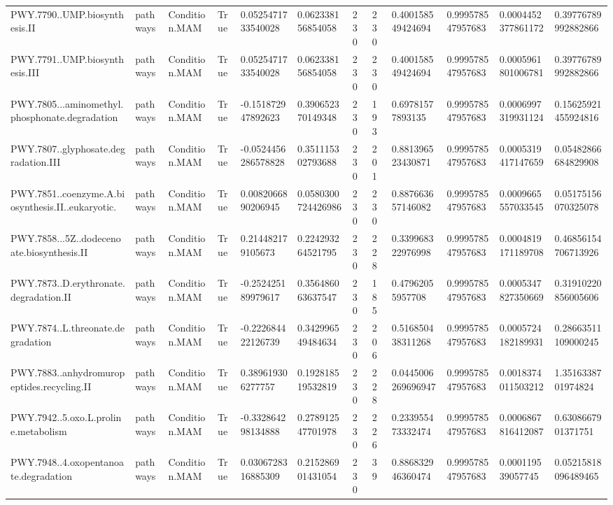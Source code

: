 \begin{longtable}{llllllllllll}
PWY.7790..UMP.biosynthesis.II & pathways & Condition.MAM & True & 0.0525471733540028 & 0.062338156854058 & 230 & 230 & 0.400158549424694 & 0.999578547957683 & 0.0004452377861172 & 0.39776789992882866 \\
PWY.7791..UMP.biosynthesis.III & pathways & Condition.MAM & True & 0.0525471733540028 & 0.062338156854058 & 230 & 230 & 0.400158549424694 & 0.999578547957683 & 0.0005961801006781 & 0.39776789992882866 \\
PWY.7805...aminomethyl.phosphonate.degradation & pathways & Condition.MAM & True & -0.151872947892623 & 0.390652370149348 & 230 & 193 & 0.69781577893135 & 0.999578547957683 & 0.0006997319931124 & 0.15625921455924816 \\
PWY.7807..glyphosate.degradation.III & pathways & Condition.MAM & True & -0.0524456286578828 & 0.351115302793688 & 230 & 201 & 0.881396523430871 & 0.999578547957683 & 0.0005319417147659 & 0.05482866684829908 \\
PWY.7851..coenzyme.A.biosynthesis.II..eukaryotic. & pathways & Condition.MAM & True & 0.0082066890206945 & 0.0580300724426986 & 230 & 230 & 0.887663657146082 & 0.999578547957683 & 0.0009665557033545 & 0.05175156070325078 \\
PWY.7858...5Z..dodecenoate.biosynthesis.II & pathways & Condition.MAM & True & 0.214482179105673 & 0.224293264521795 & 230 & 228 & 0.339968322976998 & 0.999578547957683 & 0.0004819171189708 & 0.46856154706713926 \\
PWY.7873..D.erythronate.degradation.II & pathways & Condition.MAM & True & -0.252425189979617 & 0.356486063637547 & 230 & 185 & 0.47962055957708 & 0.999578547957683 & 0.0005347827350669 & 0.31910220856005606 \\
PWY.7874..L.threonate.degradation & pathways & Condition.MAM & True & -0.222684422126739 & 0.342996549484634 & 230 & 206 & 0.516850438311268 & 0.999578547957683 & 0.0005724182189931 & 0.28663511109000245 \\
PWY.7883..anhydromuropeptides.recycling.II & pathways & Condition.MAM & True & 0.389619306277757 & 0.192818519532819 & 230 & 228 & 0.0445006269696947 & 0.999578547957683 & 0.0018374011503212 & 1.3516338701974824 \\
PWY.7942..5.oxo.L.proline.metabolism & pathways & Condition.MAM & True & -0.332864298134888 & 0.278912547701978 & 230 & 226 & 0.233955473332474 & 0.999578547957683 & 0.0006867816412087 & 0.6308667901371751 \\
PWY.7948..4.oxopentanoate.degradation & pathways & Condition.MAM & True & 0.0306728316885309 & 0.215286901431054 & 230 & 39 & 0.886832946360474 & 0.999578547957683 & 0.000119539057745 & 0.05215818096489465 \\

\end{longtable}
